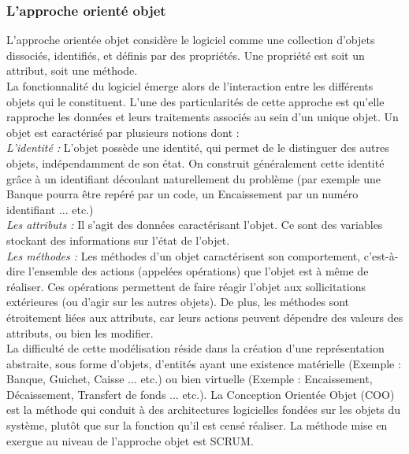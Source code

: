 \subsubsection{L’approche orienté objet }
	L’approche orientée objet considère le logiciel comme une collection d’objets dissociés, identifiés, et définis par des propriétés. Une propriété est soit un attribut, soit une méthode. \\
	La fonctionnalité du logiciel émerge alors de l’interaction entre les différents objets qui le constituent. L’une des particularités de cette approche est qu’elle rapproche les données et leurs traitements associés au sein d’un unique objet. Un objet est caractérisé par plusieurs notions dont : \\
	\textit{L’identité :} L’objet possède une identité, qui permet de le distinguer des autres objets, indépendamment de son état. On construit généralement cette identité grâce à un identifiant découlant naturellement du problème (par exemple une Banque pourra être repéré par un code, un Encaissement par un numéro identifiant ... etc.) \\
	\textit{Les attributs :} Il s’agit des données caractérisant l’objet. Ce sont des variables stockant des informations sur l’état de l’objet. \\
	\textit{Les méthodes :} Les méthodes d’un objet caractérisent son comportement, c’est-à-dire l’ensemble des actions (appelées opérations) que l’objet est à même de réaliser. Ces opérations permettent de faire réagir l’objet aux sollicitations extérieures (ou d’agir sur les autres objets). De plus, les méthodes sont étroitement liées aux attributs, car leurs actions peuvent dépendre des valeurs des attributs, ou bien les modifier. \\ 
	La difficulté de cette modélisation réside dans la création d’une représentation abstraite, sous forme d’objets, d’entités ayant une existence matérielle (Exemple : Banque, Guichet, Caisse ... etc.) ou bien virtuelle (Exemple : Encaissement, Décaissement, Transfert de fonds ... etc.). La Conception Orientée Objet (COO) est la méthode qui conduit à des architectures logicielles fondées sur les objets du système, plutôt que sur la fonction qu’il est censé réaliser. La méthode mise en exergue au niveau de l’approche objet est SCRUM. \\
